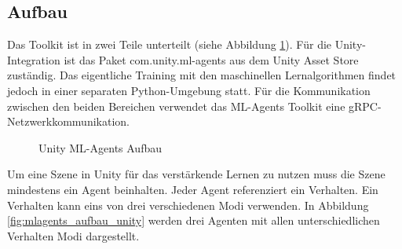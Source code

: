 \subsection{Aufbau}
Das Toolkit ist in zwei Teile unterteilt (siehe Abbildung \ref{fig:mlagents_aufbau}). Für die Unity-Integration ist das Paket com.unity.ml-agents aus dem Unity Asset Store zuständig. Das eigentliche Training mit den maschinellen Lernalgorithmen findet jedoch in einer separaten Python-Umgebung statt. Für die Kommunikation zwischen den beiden Bereichen verwendet das ML-Agents Toolkit eine gRPC-Netzwerkkommunikation.\cite{juliani2020}

\begin{figure}[H]
  \centering  
  \caption{Unity ML-Agents Aufbau}
  \label{fig:mlagents_aufbau}
\end{figure}

Um eine Szene in Unity für das verstärkende Lernen zu nutzen muss die Szene mindestens ein Agent beinhalten. Jeder Agent referenziert ein Verhalten. Ein Verhalten kann eins von drei verschiedenen Modi verwenden. In Abbildung \ref{fig:mlagents_aufbau_unity} werden drei Agenten mit allen unterschiedlichen Verhalten Modi dargestellt.

